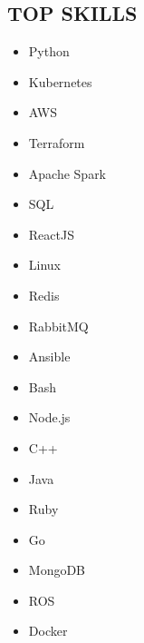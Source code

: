 \documentclass[]{res}
\begin{document}
\address{
Bachelor of Software Engineering (BSE), University of Waterloo 2018 \\
(415) 980-9210 \textbar ~paul.ashbourne@gmail.com \\
\url{https://linkedin.com/in/paulashbourne} %
}
\address{\hfill 3766 21st Street \\ \hfill San Francisco, California \\ \hfill USA 94114}
\begin{resume}

\section{TOP SKILLS}
\setlength\multicolsep{0pt}
\begin{multicols}{5}
  \begin{itemize}
    \item Python
    \item Kubernetes
    \item AWS
    \item Terraform
    \item Apache Spark
    \item SQL
    \item ReactJS
    \item Linux
    \item Redis
    \item RabbitMQ
    \item Ansible
    \item Bash
    \item Node.js
    \item C++
    \item Java
    \item Ruby
    \item Go
    \item MongoDB
    \item ROS
    \item Docker
  \end{itemize}
\end{multicols}


\end{resume}
\end{document}
